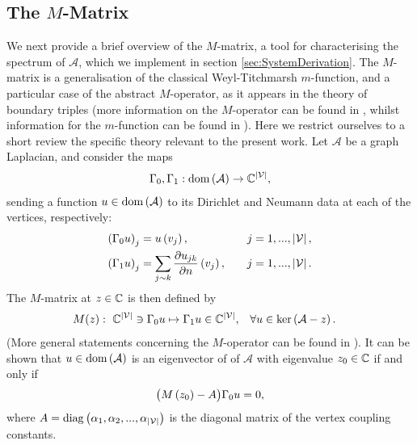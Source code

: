 \subsection{The $M$-Matrix} \label{ssec:MMatrix}
We next provide a brief overview of the $M$-matrix, a tool for characterising the spectrum of $\mathcal{A}$, which we implement in section \ref{sec:SystemDerivation}.
The $M$-matrix is a generalisation of the classical Weyl-Titchmarsh $m$-function, and a particular case of the abstract $M$-operator, as it appears in the theory of boundary triples (more information on the $M$-operator can be found in \cite{kochubei1975extensions, kochubei1980characteristic, gorbachuk1991boundary, brown2008boundary, brown2020functional, cherednichenko2020scattering, cherednichenko2018functional}, whilst information for the $m$-function can be found in \cite{titchmarsh1962eigenfunction, atkinson1964discrete}).
Here we restrict ourselves to a short review the specific theory relevant to the present work.
Let $\mathcal{A}$ be a graph Laplacian, and consider the maps
\begin{align*}
	\Gamma_0, \Gamma_1: \mathrm{dom}\left( \mathcal{A} \right) \rightarrow \mathbb{C}^{\left\lvert \mathcal{V} \right\rvert},
\end{align*}
sending a function $u\in\mathrm{dom}\left( \mathcal{A} \right)$ to its Dirichlet and Neumann data at each of the vertices, respectively:
\begin{align*}
	\left( \Gamma_0 u \right)_j &= u\left( v_j \right), \quad &j=1,...,\left\lvert \mathcal{V} \right\rvert, \\
	\left( \Gamma_1 u \right)_j &= \sum_{j\sim k}\dfrac{\partial u_{jk}}{\partial n}\left( v_j \right), \quad &j=1,...,\left\lvert \mathcal{V} \right\rvert. 
\end{align*}
The $M$-matrix at $z\in\mathbb{C}$ is then defined by
\begin{align*}
	M(z): \ \mathbb{C}^{\left\lvert \mathcal{V} \right\rvert} \ni \Gamma_0 u \mapsto \Gamma_1 u \in \mathbb{C}^{\left\lvert \mathcal{V} \right\rvert},
	 &\quad \forall u\in\mathrm{ker}\left( \mathcal{A}-z \right).
\end{align*}
(More general statements concerning the $M$-operator can be found in \cite{derkach1991generalized, derkach2014boundary}).
It can be shown that $u\in\mathrm{dom}\left( \mathcal{A} \right)$ is an eigenvector of of $\mathcal{A}$ with eigenvalue $z_0\in\mathbb{C}$ if and only if
\begin{align*}
	\bigl( M\left( z_0 \right) - A \bigr) \Gamma_0 u = 0,
\end{align*}
 where $A = \mathrm{diag}\left( \alpha_1, \alpha_2, ... , \alpha_{\left\lvert \mathcal{V} \right\rvert} \right)$ is the diagonal matrix of the vertex coupling constants.
